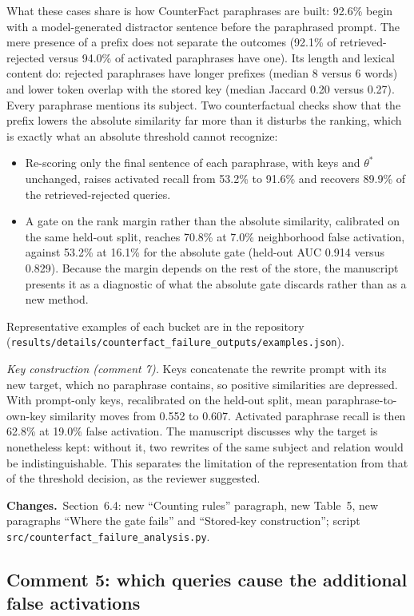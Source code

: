 \documentclass[11pt]{article}
\newcommand{\changes}{\par\smallskip\noindent\textbf{Changes.}\ }
\begin{document}
What these cases share is how CounterFact paraphrases are built: 92.6\% begin with a model-generated distractor sentence before the paraphrased prompt. The mere presence of a prefix does not separate the outcomes (92.1\% of retrieved-rejected versus 94.0\% of activated paraphrases have one). Its length and lexical content do: rejected paraphrases have longer prefixes (median 8 versus 6 words) and lower token overlap with the stored key (median Jaccard 0.20 versus 0.27). Every paraphrase mentions its subject. Two counterfactual checks show that the prefix lowers the absolute similarity far more than it disturbs the ranking, which is exactly what an absolute threshold cannot recognize:
\begin{itemize}
\item Re-scoring only the final sentence of each paraphrase, with keys and $\theta^*$ unchanged, raises activated recall from 53.2\% to 91.6\% and recovers 89.9\% of the retrieved-rejected queries.
\item A gate on the rank margin rather than the absolute similarity, calibrated on the same held-out split, reaches 70.8\% at 7.0\% neighborhood false activation, against 53.2\% at 16.1\% for the absolute gate (held-out AUC 0.914 versus 0.829). Because the margin depends on the rest of the store, the manuscript presents it as a diagnostic of what the absolute gate discards rather than as a new method.
\end{itemize}
Representative examples of each bucket are in the repository (\nolinkurl{results/details/counterfact_failure_outputs/examples.json}).

\emph{Key construction (comment 7).} Keys concatenate the rewrite prompt with its new target, which no paraphrase contains, so positive similarities are depressed. With prompt-only keys, recalibrated on the held-out split, mean paraphrase-to-own-key similarity moves from 0.552 to 0.607. Activated paraphrase recall is then 62.8\% at 19.0\% false activation. The manuscript discusses why the target is nonetheless kept: without it, two rewrites of the same subject and relation would be indistinguishable. This separates the limitation of the representation from that of the threshold decision, as the reviewer suggested.

\changes Section~6.4: new ``Counting rules'' paragraph, new Table~5, new paragraphs ``Where the gate fails'' and ``Stored-key construction''; script \texttt{src/counterfact\_failure\_analysis.py}.

\subsection*{Comment 5: which queries cause the additional false activations}
\end{document}
